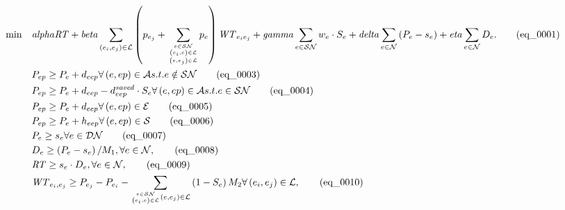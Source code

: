 \begin{align}
  \min\quad & \mathit{alpha} \mathit{RT} + \mathit{beta} \sum_{\left(e_{i} , e_{j}\right) \in \mathcal{L}} \left(p_{e_{j}} + \underset{\genfrac{}{}{0pt}{}{\genfrac{}{}{0pt}{}{e \in \mathcal{SN}}{\left(e_{i} , e\right) \in \mathcal{L}}}{\left(e , e_{j}\right) \in \mathcal{L}}}{\sum} p_{e}\right) \mathit{WT}_{e_{i} e_{j}} + \mathit{gamma} \sum_{e \in \mathcal{SN}} w_{e} \cdot S_{e} + \mathit{delta} \sum_{e \in \mathcal{N}} \left(P_{e} - s_{e}\right) + \mathit{eta} \sum_{e \in \mathcal{N}} D_{e} . \tag{eq\_0001} \\
  & P_{ep} \geq P_{e} + d_{eep} \forall \left(e , ep\right) \in \mathcal{A} s . t . e \notin \mathcal{SN} \tag{eq\_0003} \\
  & P_{ep} \geq P_{e} + d_{eep} - d_{eep}^{\mathit{saved}} \cdot S_{e} \forall \left(e , ep\right) \in \mathcal{A} s . t . e \in \mathcal{SN} \tag{eq\_0004} \\
  & P_{ep} \geq P_{e} + d_{eep} \forall \left(e , ep\right) \in \mathcal{E} \tag{eq\_0005} \\
  & P_{ep} \geq P_{e} + h_{eep} \forall \left(e , ep\right) \in \mathcal{S} \tag{eq\_0006} \\
  & P_{e} \geq s_{e} \forall e \in \mathcal{DN} \tag{eq\_0007} \\
  & D_{e} \geq \left(P_{e} - s_{e}\right) / M_{1} , \forall e \in \mathcal{N} , \tag{eq\_0008} \\
  & \mathit{RT} \geq s_{e} \cdot D_{e} , \forall e \in \mathcal{N} , \tag{eq\_0009} \\
  & \mathit{WT}_{e_{i} , e_{j}} \geq P_{e_{j}} - P_{e_{i}} - \underset{\genfrac{}{}{0pt}{}{e \in \mathcal{SN}}{\left(e_{i} , e\right) \in \mathcal{L}} \left(e , e_{j}\right) \in \mathcal{L}}{\sum} \left(1 - S_{e}\right) M_{2} \forall \left(e_{i} , e_{j}\right) \in \mathcal{L} , \tag{eq\_0010} \\
\end{align}
